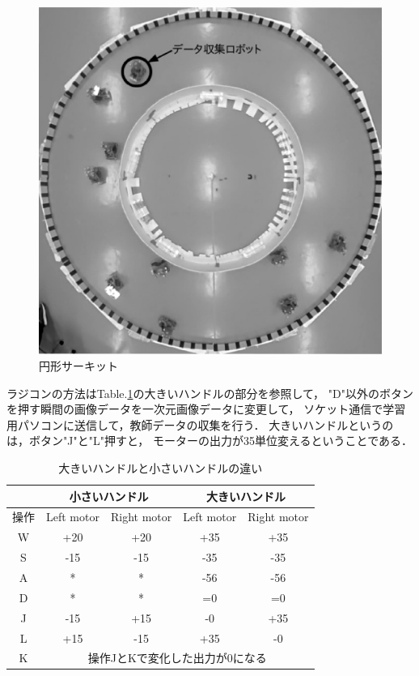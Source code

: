 \vspace{-2mm}
\begin{figure}[h]
        \centering
        \includegraphics[width=0.8\linewidth]{teacher_collection.eps}
        \caption{円形サーキット}
        \label{data_colle}
\end{figure}

ラジコンの方法はTable.\ref{radio_rule}の大きいハンドルの部分を参照して，
"D"以外のボタンを押す瞬間の画像データを一次元画像データに変更して，
ソケット通信で学習用パソコンに送信して，教師データの収集を行う．
大きいハンドルというのは，ボタン"J"と"L"押すと，
モーターの出力が35単位変えるということである．

\begin{table}[!ht]
\caption{
大きいハンドルと小さいハンドルの違い
\label{radio_rule}}
\setlength\tabcolsep{1pt}
\begin{center}
\begin{tabular}{|c|c|c|c|c|}
\hline
 & \multicolumn{2}{|c|}{小さいハンドル} & \multicolumn{2}{c|}{大きいハンドル}\\
\hline
 操作& Left motor & Right motor & Left motor & Right motor \\
\hline
W & +20 & +20 & +35 & +35\\
\hline
S & -15 & -15 & -35 & -35\\
\hline
A & * & * & -56 & -56\\
\hline
D & * & * & =0 & =0 \\
\hline
J & -15 & +15 & -0 & +35 \\
\hline
L & +15 & -15 & +35 & -0 \\
\hline
K & \multicolumn{4}{|c|}{操作JとKで変化した出力が0になる} \\
\hline
\end{tabular}
\end{center}
\end{table}


